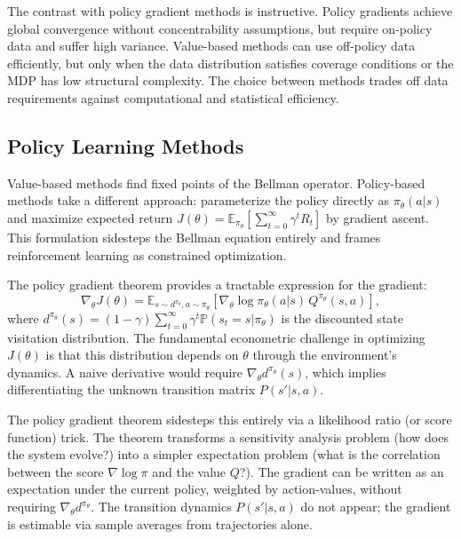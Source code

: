 The contrast with policy gradient methods is instructive. Policy gradients achieve global convergence without concentrability assumptions, but require on-policy data and suffer high variance. Value-based methods can use off-policy data efficiently, but only when the data distribution satisfies coverage conditions or the MDP has low structural complexity. The choice between methods trades off data requirements against computational and statistical efficiency.


\subsection{Policy Learning Methods}
\label{sec:policy_gradient}

Value-based methods find fixed points of the Bellman operator. Policy-based methods take a different approach: parameterize the policy directly as $\pi_\theta(a|s)$ and maximize expected return $J(\theta) = \mathbb{E}_{\pi_\theta}[\sum_{t=0}^\infty \gamma^t R_t]$ by gradient ascent. This formulation sidesteps the Bellman equation entirely and frames reinforcement learning as constrained optimization.

The policy gradient theorem \citep{SuttonMcAllester2000} provides a tractable expression for the gradient:
\begin{equation}
\nabla_\theta J(\theta) = \mathbb{E}_{s \sim d^{\pi_\theta}, a \sim \pi_\theta} \left[ \nabla_\theta \log \pi_\theta(a|s) \, Q^{\pi_\theta}(s,a) \right],
\label{eq:policy_gradient}
\end{equation}
where $d^{\pi_\theta}(s) = (1-\gamma) \sum_{t=0}^\infty \gamma^t \mathbb{P}(s_t = s | \pi_\theta)$ is the discounted state visitation distribution. The fundamental econometric challenge in optimizing $J(\theta)$ is that this distribution depends on $\theta$ through the environment's dynamics. A naive derivative would require $\nabla_\theta d^{\pi_\theta}(s)$, which implies differentiating the unknown transition matrix $P(s'|s,a)$.

The policy gradient theorem sidesteps this entirely via a likelihood ratio (or score function) trick. The theorem transforms a sensitivity analysis problem (how does the system evolve?) into a simpler expectation problem (what is the correlation between the score $\nabla \log \pi$ and the value $Q$?). The gradient can be written as an expectation under the current policy, weighted by action-values, without requiring $\nabla_\theta d^{\pi_\theta}$. The transition dynamics $P(s'|s,a)$ do not appear; the gradient is estimable via sample averages from trajectories alone.

